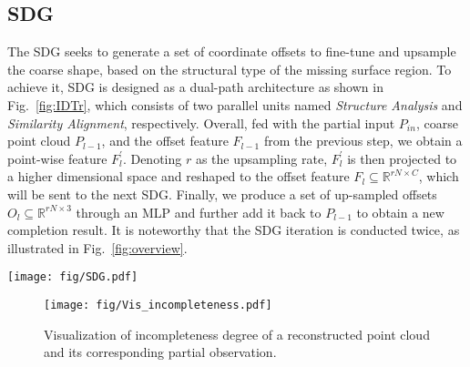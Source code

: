 \subsection{SDG}
The SDG seeks to generate a set of coordinate offsets to fine-tune and upsample the coarse shape, based on the structural type of the missing surface region.
To achieve it, SDG is designed as a dual-path architecture as shown in Fig.~\ref{fig:IDTr}, which consists of two parallel units named \emph{Structure Analysis} and \emph{Similarity Alignment}, respectively. 
Overall, fed with the partial input $P_{in}$, coarse point cloud $P_{l-1}$, and the offset feature $F_{l-1}$ from the previous step, we obtain a point-wise feature $F_{l}^{\prime}$. 
Denoting $r$ as the upsampling rate, $F_{l}^{\prime}$ is then projected to a higher dimensional space and reshaped to the offset feature $F_{l}\subseteq\mathbb{R}^{rN\times C}$, which will be sent to the next SDG.
Finally, we produce a set of up-sampled offsets $O_{l}\subseteq\mathbb{R}^{rN\times 3}$ through an MLP and further add it back to $P_{l-1}$ to obtain a new completion result. It is noteworthy that the SDG iteration is conducted twice, as illustrated in Fig.~\ref{fig:overview}.

\begin{figure*}[h]
  \centering
  \texttt{[image: fig/SDG.pdf]}
\caption{The architecture of SDG. The upper path represents Structure Analysis and the lower path represents Similarity Alignment. Each sub-network generates an offset feature which is then combined using a Path Selection module and used to regress into the coordinate offsets.}
  \label{fig:IDTr}
\end{figure*}

\begin{figure}[h]
  \centering
  \texttt{[image: fig/Vis\_incompleteness.pdf]}
\caption{Visualization of incompleteness degree of a reconstructed point cloud and its corresponding partial observation.}
  \label{fig:Vis_incom}
\end{figure}

